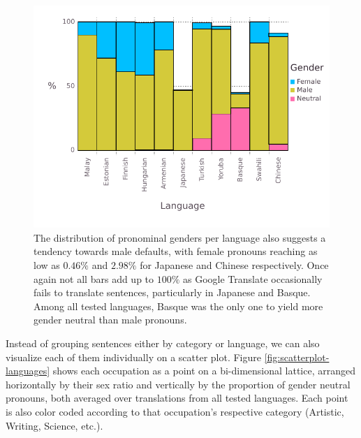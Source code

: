 \documentclass[jair,twoside,11pt,theapa]{article}
\begin{document}
\begin{figure}[H]
  \centering
  \includegraphics[width=\linewidth]{pictures/gender-by-language}
  \caption{The distribution of pronominal genders per language also suggests a tendency towards male defaults, with female pronouns reaching as low as $0.46\%$ and $2.98\%$ for Japanese and Chinese respectively. Once again not all bars add up to $100\%$ as Google Translate occasionally fails to translate sentences, particularly in Japanese and Basque. Among all tested languages, Basque was the only one to yield more gender neutral than male pronouns.}
  \label{fig:gender-by-language}
\end{figure}

Instead of grouping sentences either by category or language, we can also visualize each of them individually on a scatter plot. Figure \ref{fig:scatterplot-languages} shows each occupation as a point on a bi-dimensional lattice, arranged horizontally by their sex ratio and vertically by the proportion of gender neutral pronouns, both averaged over translations from all tested languages. Each point is also color coded according to that occupation's respective category (Artistic, Writing, Science, etc.).
\end{document}
